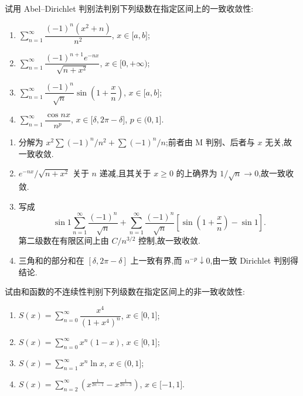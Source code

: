 \begin{example}
    试用 Abel--Dirichlet 判别法判别下列级数在指定区间上的一致收敛性:
    \begin{enumerate}
        \item $\displaystyle\sum\limits_{n=1}^{\infty}\dfrac{(-1)^n(x^2+n)}{n^2}$, $x\in\lbrack a,b\rbrack$;
        \item $\displaystyle\sum\limits_{n=1}^{\infty}\dfrac{(-1)^{n+1}e^{-nx}}{\sqrt{n+x^2}}$, $x\in\lbrack 0,+\infty)$;
        \item $\displaystyle\sum\limits_{n=1}^{\infty}\dfrac{(-1)^n}{\sqrt n}\sin\left(1+\dfrac{x}{n}\right)$, $x\in\lbrack a,b\rbrack$;
        \item $\displaystyle\sum\limits_{n=1}^{\infty}\dfrac{\cos nx}{n^p}$, $x\in\lbrack \delta,2\pi-\delta\rbrack$, $p\in(0,1\rbrack$.
    \end{enumerate}
\end{example}
\exampleblank

\begin{solution}
    \begin{enumerate}
        \item 分解为 $x^2\sum(-1)^n/n^2+\sum(-1)^n/n$;前者由 M 判别、后者与 $x$ 无关,故一致收敛.
        \item $e^{-nx}/\sqrt{n+x^2}$ 关于 $n$ 递减,且其关于 $x\geq0$ 的上确界为 $1/\sqrt n\to0$,故一致收敛.
        \item 写成
              \[
                  \sin1\sum\limits_{n=1}^{\infty}\dfrac{(-1)^n}{\sqrt n}
                  +\sum\limits_{n=1}^{\infty}\dfrac{(-1)^n}{\sqrt n}
                  \left[\sin\left(1+\dfrac{x}{n}\right)-\sin1\right].
              \]
              第二级数在有限区间上由 $C/n^{3/2}$ 控制,故一致收敛.
        \item 三角和的部分和在 $[\delta,2\pi-\delta]$ 上一致有界,而 $n^{-p}\downarrow0$,由一致 Dirichlet 判别得结论.
    \end{enumerate}
\end{solution}

\begin{example}
    试由和函数的不连续性判别下列级数在指定区间上的非一致收敛性:
    \begin{enumerate}
        \item $\displaystyle S(x)=\sum\limits_{n=0}^{\infty}\dfrac{x^4}{(1+x^4)^n}$, $x\in\lbrack 0,1\rbrack$;
        \item $\displaystyle S(x)=\sum\limits_{n=0}^{\infty}x^n(1-x)$, $x\in\lbrack 0,1\rbrack$;
        \item $\displaystyle S(x)=\sum\limits_{n=1}^{\infty}x^n\ln x$, $x\in(0,1\rbrack$;
        \item $\displaystyle S(x)=\sum\limits_{n=2}^{\infty}\left(x^{\frac{1}{2n-1}}-x^{\frac{1}{2n-3}}\right)$, $x\in\lbrack -1,1\rbrack$.
    \end{enumerate}
\end{example}
\exampleblank

